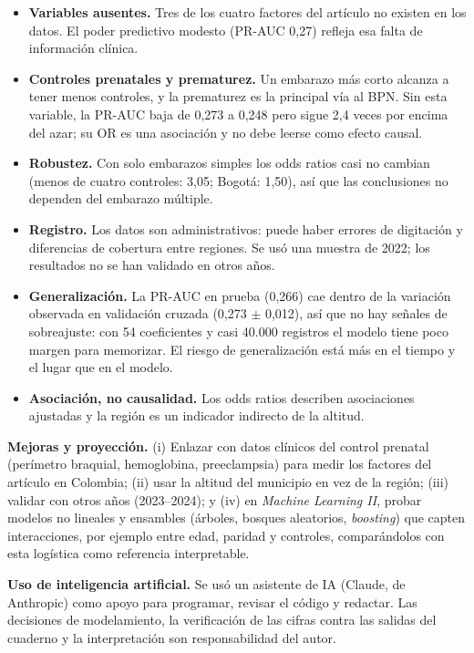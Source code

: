 \documentclass[11pt,a4paper]{article}
\begin{document}
\begin{itemize}
\item \textbf{Variables ausentes.} Tres de los cuatro factores del artículo no existen en los datos. El poder predictivo modesto (PR-AUC 0,27) refleja esa falta de información clínica.
\item \textbf{Controles prenatales y prematurez.} Un embarazo más corto alcanza a tener menos controles, y la prematurez es la principal vía al BPN. Sin esta variable, la PR-AUC baja de 0,273 a 0,248 pero sigue 2,4 veces por encima del azar; su OR es una asociación y no debe leerse como efecto causal.
\item \textbf{Robustez.} Con solo embarazos simples los odds ratios casi no cambian (menos de cuatro controles: 3,05; Bogotá: 1,50), así que las conclusiones no dependen del embarazo múltiple.
\item \textbf{Registro.} Los datos son administrativos: puede haber errores de digitación y diferencias de cobertura entre regiones. Se usó una muestra de 2022; los resultados no se han validado en otros años.
\item \textbf{Generalización.} La PR-AUC en prueba (0,266) cae dentro de la variación observada en validación cruzada (0,273 $\pm$ 0,012), así que no hay señales de sobreajuste: con 54 coeficientes y casi 40.000 registros el modelo tiene poco margen para memorizar. El riesgo de generalización está más en el tiempo y el lugar que en el modelo.
\item \textbf{Asociación, no causalidad.} Los odds ratios describen asociaciones ajustadas y la región es un indicador indirecto de la altitud.
\end{itemize}

\textbf{Mejoras y proyección.} (i) Enlazar con datos clínicos del control prenatal (perímetro braquial, hemoglobina, preeclampsia) para medir los factores del artículo en Colombia; (ii) usar la altitud del municipio en vez de la región; (iii) validar con otros años (2023--2024); y (iv) en \emph{Machine Learning II}, probar modelos no lineales y ensambles (árboles, bosques aleatorios, \emph{boosting}) que capten interacciones, por ejemplo entre edad, paridad y controles, comparándolos con esta logística como referencia interpretable.

\textbf{Uso de inteligencia artificial.} Se usó un asistente de IA (Claude, de Anthropic) como apoyo para programar, revisar el código y redactar. Las decisiones de modelamiento, la verificación de las cifras contra las salidas del cuaderno y la interpretación son responsabilidad del autor.
\end{document}
